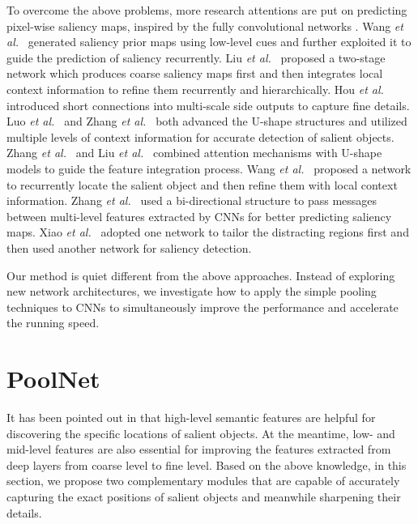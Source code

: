 \documentclass[10pt,twocolumn,letterpaper]{article}
\def\etal{{\em et al.~}}
\begin{document}
To overcome the above problems, more research attentions are put 
on predicting pixel-wise saliency maps, inspired by the 
fully convolutional networks \cite{long2015fully}.
Wang \etal \cite{wangsaliency} generated saliency prior maps using low-level cues and 
further exploited it to guide the prediction of saliency recurrently.
Liu \etal \cite{liu2016dhsnet} proposed a two-stage network which produces coarse saliency maps 
first and then integrates local context information to refine them recurrently and hierarchically.
Hou \etal \cite{hou2016deeply} introduced short connections into multi-scale side outputs to capture fine details.
Luo \etal \cite{luo2017non} and Zhang \etal \cite{zhang2017amulet} 
both advanced the U-shape structures and utilized multiple levels 
of context information for accurate detection of salient objects.
Zhang \etal \cite{zhang2018progressive} and Liu \etal \cite{liu2018picanet} combined 
attention mechanisms with U-shape models to guide the feature 
integration process.
Wang \etal \cite{wang2018detect} proposed a network to recurrently 
locate the salient object and then refine them with local context information.
Zhang \etal \cite{zhang2018bi} used a bi-directional structure to 
pass messages between multi-level features extracted by CNNs 
for better predicting saliency maps.
Xiao \etal \cite{xiao2018deep} adopted one network to tailor the
distracting regions first and then used another network for 
saliency detection.


Our method is quiet different from the above approaches.
Instead of exploring new network architectures, we investigate
how to apply the simple pooling techniques to CNNs to simultaneously 
improve the performance and accelerate the running speed.

\section{PoolNet} \label{sec:method}

It has been pointed out in 
\cite{liu2016dhsnet,hou2016deeply,wang2017stagewise,wang2018detect} that high-level semantic
features are helpful for discovering the specific locations of salient objects.
At the meantime, low- and mid-level features are also essential for improving
the features extracted from deep layers from coarse level to fine level.
Based on the above knowledge, in this section, we propose two 
complementary modules that are capable of accurately capturing 
the exact positions of salient objects and 
meanwhile sharpening their details.
\end{document}
